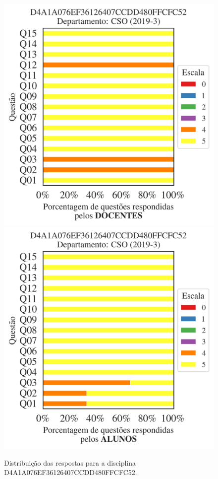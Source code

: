 \documentclass[a4paper,10pt]{article}
\begin{document}
\begin{figure}[h]
\centering
\includegraphics[width=0.485\linewidth]{analise_disciplina_departamento_CSO_D4A1A076EF36126407CCDD480FFCFC52_docentes.png}
\includegraphics[width=0.485\linewidth]{analise_disciplina_departamento_CSO_D4A1A076EF36126407CCDD480FFCFC52_alunos.png}
\caption{\label{fig:analise_geral_departamento}                Distribuição das respostas para a disciplina D4A1A076EF36126407CCDD480FFCFC52. }
\end{figure}
\end{document}
